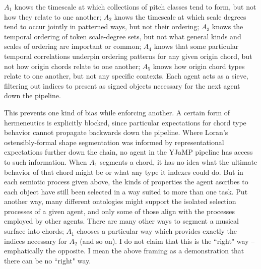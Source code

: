 $A_1$ knows the timescale at which collections of pitch classes tend to form, but not how they relate to one another; $A_2$ knows the timescale at which scale degrees tend to occur jointly in patterned ways, but not their ordering; $A_3$ knows the temporal ordering of token scale-degree sets, but not what general kinds and scales of ordering are important or common; $A_4$ knows that some particular temporal correlations underpin ordering patterns for any given origin chord, but not how origin chords relate to one another; $A_5$ knows how origin chord types relate to one another, but not any specific contexts.  Each agent acts as a sieve, filtering out indices to present as signed objects necessary for the next agent down the pipeline.

This prevents one kind of bias while enforcing another.  A certain form of hermeneutics is explicitly blocked, since particular expectations for chord type behavior cannot propagate backwards down the pipeline.  Where Loran's ostensibly-formal shape segmentation was informed by representational expectations further down the chain, no agent in the YJaMP pipeline has access to such information.  When $A_1$ segments a chord, it has no idea what the ultimate behavior of that chord might be or what any type it indexes could do.  But in each semiotic process given above, the kinds of properties the agent ascribes to each object have still been selected in a way suited to more than one task.  Put another way, many different ontologies might support the isolated selection processes of a given agent, and only some of those align with the processes employed by other agents.  There are many other ways to segment a musical surface into chords; $A_1$ chooses a particular way which provides exactly the indices necessary for $A_2$ (and so on).  I do not claim that this is the ``right" way -- emphatically the opposite.  I mean the above framing as a demonstration that there can be no ``right" way.

